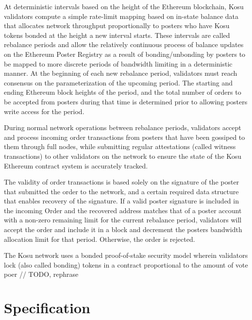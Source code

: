 \documentclass[10pt]{article}
\begin{document}
At deterministic intervals based on the height of the Ethereum blockchain, Kosu validators compute a simple rate-limit mapping based on in-state balance data that allocates network throughput proportionally to posters who have Kosu tokens bonded at the height a new interval starts. These intervals are called rebalance periods and allow the relatively continuous process of balance updates on the Ethereum Poster Registry as a result of bonding/unbonding by posters to be mapped to more discrete periods of bandwidth limiting in a deterministic manner. At the beginning of each new rebalance period, validators must reach consensus on the parameterization of the upcoming period. The starting and ending Ethereum block heights of the period, and the total number of orders to be accepted from posters during that time is determined prior to allowing posters write access for the period.
\medskip

During normal network operations between rebalance periods, validators accept and process incoming order transactions from posters that have been gossiped to them through full nodes, while submitting regular attestations (called witness transactions) to other validators on the network to ensure the state of the Kosu Ethereum contract system is accurately tracked.
\medskip

The validity of order transactions is based solely on the signature of the poster that submitted the order to the network, and a certain required data structure that enables recovery of the signature. If a valid poster signature is included in the incoming Order and the recovered address matches that of a poster account with a non-zero remaining limit for the current rebalance period, validators will accept the order and include it in a block and decrement the posters bandwidth allocation limit for that period. Otherwise, the order is rejected.
\medskip

The Kosu network uses a bonded proof-of-stake security model wherein validators lock (also called bonding) tokens in a contract proportional to the amount of vote poer // TODO, rephrase
\clearpage
\pagebreak


\section{Specification}\label{specification}
\end{document}
